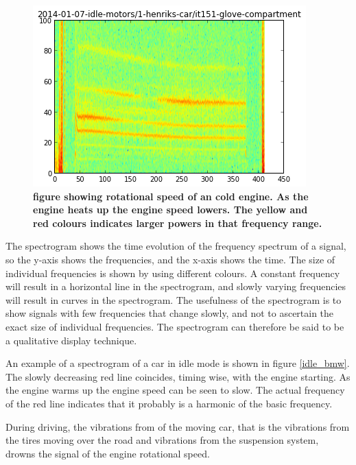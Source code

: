 \begin{figure}[!ht]
\begin{center}
\includegraphics{idle_henrik.png}
\caption{{\bf figure showing rotational speed of an cold engine. As the engine heats up the engine speed lowers. The yellow and red colours indicates larger powers in that frequency range.}}
\label{idle_henrik}
\end{center}
\end{figure}

The spectrogram shows the time evolution of the frequency spectrum of a signal, so the y-axis shows the frequencies, and the x-axis shows the time. The size of individual frequencies is shown by using different colours. A constant frequency will result in a horizontal line in the spectrogram, and slowly varying frequencies will result in curves in the spectrogram. The usefulness of the spectrogram is to show signals with few  frequencies that change slowly, and not to ascertain the exact size of individual frequencies. The spectrogram can therefore be said to be a qualitative display technique.

An example of a spectrogram of a car in idle mode is shown in figure \ref{idle_bmw}. The slowly decreasing red line coincides, timing wise, with the engine starting. As the engine warms up the engine speed can be seen to slow. The actual frequency of the red line indicates that it probably is a harmonic of the basic frequency.
  
During driving, the vibrations from of the moving car, that is the vibrations from the tires moving over the road and vibrations from the suspension system, drowns the signal of the engine rotational speed.

